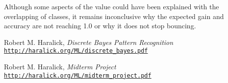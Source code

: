 \documentclass[letterpaper, conference]{IEEEtran}
\begin{document}
Although some aspects of the value could have been explained with the overlapping of classes, it remains inconclusive why the expected gain and accuracy are not reaching 1.0 or why it does not stop bouncing.

\begin{thebibliography}{2}

Robert M. Haralick,
\textit{Discrete Bayes Pattern Recognition}
\\\texttt{\url{http://haralick.org/ML/discrete_bayes.pdf}}

Robert M. Haralick,
\textit{Midterm Project}
\\\texttt{\url{http://haralick.org/ML/midterm_project.pdf}}

\end{thebibliography}
\end{document}
